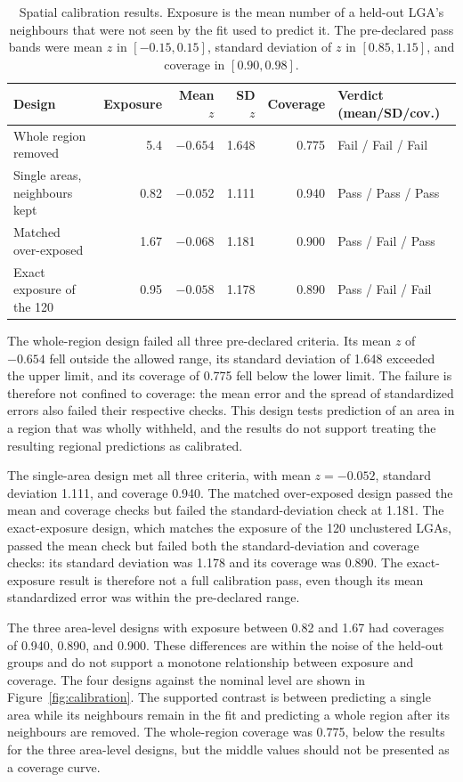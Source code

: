 \begin{table}[htbp]
  \centering
  \caption{Spatial calibration results. Exposure is the mean number of a held-out LGA's neighbours that were not seen by the fit used to predict it. The pre-declared pass bands were mean \(z\) in \([-0.15,0.15]\), standard deviation of \(z\) in \([0.85,1.15]\), and coverage in \([0.90,0.98]\).}
  \label{tab:calibration}
  \small
  \setlength{\tabcolsep}{4pt}
  \begin{tabular}{lrrrrl}
    \toprule
    Design & Exposure & Mean \(z\) & SD \(z\) & Coverage & Verdict (mean/SD/cov.) \\
    \midrule
    Whole region removed & 5.4 & \(-0.654\) & 1.648 & 0.775 & Fail / Fail / Fail \\
    Single areas, neighbours kept & 0.82 & \(-0.052\) & 1.111 & 0.940 & Pass / Pass / Pass \\
    Matched over-exposed & 1.67 & \(-0.068\) & 1.181 & 0.900 & Pass / Fail / Pass \\
    Exact exposure of the 120 & 0.95 & \(-0.058\) & 1.178 & 0.890 & Pass / Fail / Fail \\
    \bottomrule
  \end{tabular}
\end{table}

The whole-region design failed all three pre-declared criteria. Its mean \(z\) of \(-0.654\) fell outside the allowed range, its standard deviation of 1.648 exceeded the upper limit, and its coverage of 0.775 fell below the lower limit. The failure is therefore not confined to coverage: the mean error and the spread of standardized errors also failed their respective checks. This design tests prediction of an area in a region that was wholly withheld, and the results do not support treating the resulting regional predictions as calibrated.

The single-area design met all three criteria, with mean \(z=-0.052\), standard deviation 1.111, and coverage 0.940. The matched over-exposed design passed the mean and coverage checks but failed the standard-deviation check at 1.181. The exact-exposure design, which matches the exposure of the 120 unclustered LGAs, passed the mean check but failed both the standard-deviation and coverage checks: its standard deviation was 1.178 and its coverage was 0.890. The exact-exposure result is therefore not a full calibration pass, even though its mean standardized error was within the pre-declared range.

The three area-level designs with exposure between 0.82 and 1.67 had coverages of 0.940, 0.890, and 0.900. These differences are within the noise of the held-out groups and do not support a monotone relationship between exposure and coverage. The four designs against the nominal level are shown in Figure~\ref{fig:calibration}. The supported contrast is between predicting a single area while its neighbours remain in the fit and predicting a whole region after its neighbours are removed. The whole-region coverage was 0.775, below the results for the three area-level designs, but the middle values should not be presented as a coverage curve.

